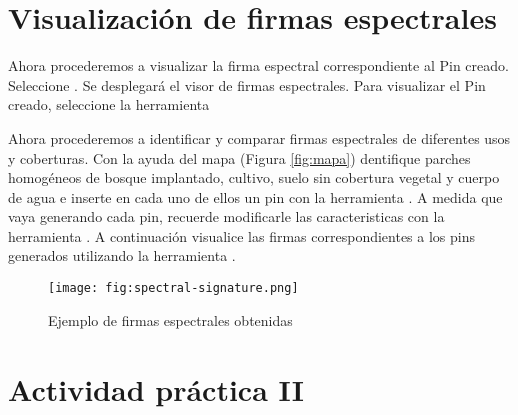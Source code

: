 \section{Visualización de firmas espectrales}

Ahora procederemos a visualizar la firma espectral correspondiente al Pin creado. Seleccione . Se desplegará el visor de firmas espectrales. Para visualizar el Pin creado, seleccione la herramienta 


Ahora procederemos a identificar y comparar firmas espectrales de diferentes usos y coberturas. Con la ayuda del mapa (Figura \ref{fig:mapa}) dentifique parches homogéneos de bosque implantado, cultivo, suelo sin cobertura vegetal y cuerpo de agua e inserte en cada uno de ellos un pin con la herramienta . A medida que vaya generando cada pin, recuerde modificarle las caracteristicas con la herramienta  . A continuación visualice las firmas correspondientes a los pins generados utilizando la herramienta .

\begin{figure}[h!]
    \centering
    \texttt{[image: fig:spectral-signature.png]}
    \caption{Ejemplo de firmas espectrales obtenidas}
    \label{fig:spectral-signature}
\end{figure}

\section{Actividad práctica II}

